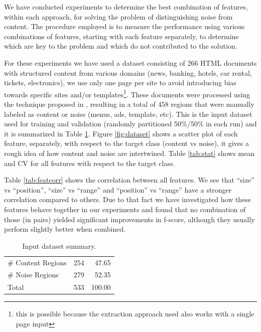 We have conducted experiments to determine the best combination of features,
within each approach, for solving the problem of distinguishing noise from
content. The procedure employed is to measure the performance using various
combinations of features, starting with each feature separately, to determine
which are key to the problem and which do not contributed to the solution.

For these experiments we have used a dataset consisting of 266 HTML documents
with structured content from various domains (news, banking, hotels, car rental,
tickets, electronics), we use only one page per site to avoid introducing bias
towards specific sites and/or templates\footnote{this is possible because the
extraction approach used also works with a single page input}. These documents
were processed using the technique proposed in
\cite{Velloso:2017:ERW:3132847.3132875}, resulting in a total of 458 regions
that were manually labeled as content or noise (menus, ads, template, etc). This
is the input dataset used for training and validation (randomly partitioned
50\%/50\% in each run) and it is summarized in Table \ref{tab:dataset}. Figure
\ref{fig:dataset} shows a scatter plot of each feature, separately, with respect
to the target class (content vs noise), it gives a rough idea of how content and
noise are intertwined. Table \ref{tab:stat} shows mean and CV for all features
with respect to the target class.

Table \ref{tab:featcorr} shows the correlation between all features. We see that
``size'' vs ``position'', ``size'' vs ``range'' and ``position'' vs ``range''
have a stronger correlation compared to others. Due to that fact we have
investigated how these features behave together in our experiments and found
that no combination of those (in pairs) yielded significant improvements in
f-score, although they usually perform slightly better when combined.

 
\begin{table}[h]
\centering
\caption{Input dataset summary.}
\label{tab:dataset}
\begin{tabular}{ | l | l | r |}
\hline
\# Content Regions & 254 & 47.65 \\
\# Noise Regions & 279 & 52.35 \\
\hline
Total & 533 & 100.00 \\
\hline
\end{tabular}
\end{table}

